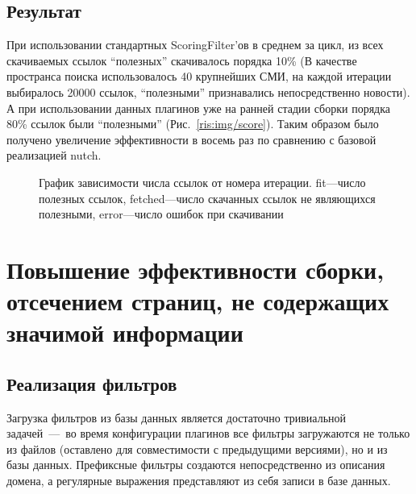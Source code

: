 \subsection*{Результат}
При использовании стандартных ScoringFilter'ов в среднем за цикл, из всех скачиваемых ссылок ``полезных'' скачивалось порядка 10\% (В качестве пространса поиска использовалось 40 крупнейших СМИ, на каждой итерации выбиралось 20000 ссылок, ``полезными'' признавались непосредственно новости). А при использовании данных плагинов уже на ранней стадии сборки порядка 80\% ссылок были ``полезными'' (Рис.~\ref{ris:img/score}). Таким образом было получено увеличение эффективности в восемь раз по сравнению с базовой реализацией nutch.

\begin{figure}[h!]
 \caption{График зависимости числа ссылок от номера итерации. fit---число полезных ссылок, fetched---число скачанных ссылок не являющихся полезными, error---число ошибок при скачивании}
 \label{ris:score}
\end{figure}

\section*{Повышение эффективности сборки, отсечением страниц, не содержащих значимой информации}
\subsection*{Реализация фильтров}
Загрузка фильтров из базы данных является достаточно тривиальной задачей~---~во время конфигурации плагинов все фильтры загружаются не только из файлов (оставлено для совместимости с предыдущими версиями), но и из базы данных. Префиксные фильтры создаются непосредственно из описания домена, а регулярные выражения представляют из себя записи в базе данных.

